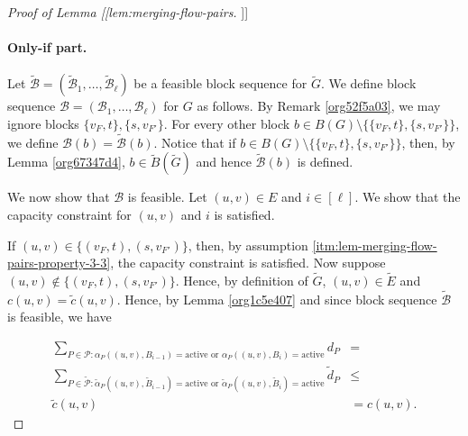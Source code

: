 \documentclass[fontsize=11pt,paper=a4]{book}
\begin{document}
\begin{proof}[Proof of Lemma [[lem:merging-flow-pairs]]]
\paragraph{Only-if part.}
Let \(\tilde{\mathcal{B}}=(\tilde{\mathscr{B}}_1,\dots,\tilde{\mathscr{B}}_{\ell})\) be a feasible block sequence for \(\tilde{G}\).
We define block sequence \(\mathcal{B}=(\mathscr{B}_1,\dots,\mathscr{B}_{\ell})\) for \(G\) as follows.
By Remark \ref{org52f5a03}, we may ignore blocks \(\{v_F,t\},\{s,v_{F'}\}\).
For every other block \(b\in B(G)\setminus\{\{v_F,t\},\{s,v_{F'}\}\}\), we define \(\mathcal{B}(b)=\tilde{\mathcal{B}}(b)\).
Notice that if \(b\in B(G)\setminus\{\{v_F,t\},\{s,v_{F'}\}\}\), then, by Lemma \ref{org67347d4}, \(b\in\tilde{B}(\tilde{G})\) and hence \(\tilde{\mathcal{B}}(b)\) is defined.

We now show that \(\mathcal{B}\) is feasible.
Let \((u,v)\in E\) and \(i\in[\ell]\).
We show that the capacity constraint for \((u,v)\) and \(i\) is satisfied.

If \((u,v)\in\{(v_F,t),(s,v_{F'})\}\), then, by assumption \ref{itm:lem-merging-flow-pairs-property-3-3}, the capacity constraint is satisfied.
Now suppose \((u,v)\notin\{(v_F,t),(s,v_{F'})\}\).
Hence, by definition of \(\tilde{G}\), \((u,v)\in\tilde{E}\) and \(c(u,v)=\tilde{c}(u,v)\).
Hence, by Lemma \ref{org1c5e407} and since block sequence \(\tilde{\mathcal{B}}\) is feasible, we have

\begin{align*}
\sum_{P\in\mathcal{P}:\alpha_P((u,v),B_{i-1})=\mathrm{active}\text{ or }\alpha_P((u,v),B_i)=\mathrm{active}}d_P&=\\
\sum_{P\in\tilde{\mathcal{P}}:\tilde{\alpha}_P((u,v),\tilde{B}_{i-1})=\mathrm{active}\text{ or }\tilde{\alpha}_P((u,v),\tilde{B}_i)=\mathrm{active}}\tilde{d}_P&\leq\\
\tilde{c}(u,v)&=
c(u,v).
\end{align*}
\end{proof}
\end{document}
